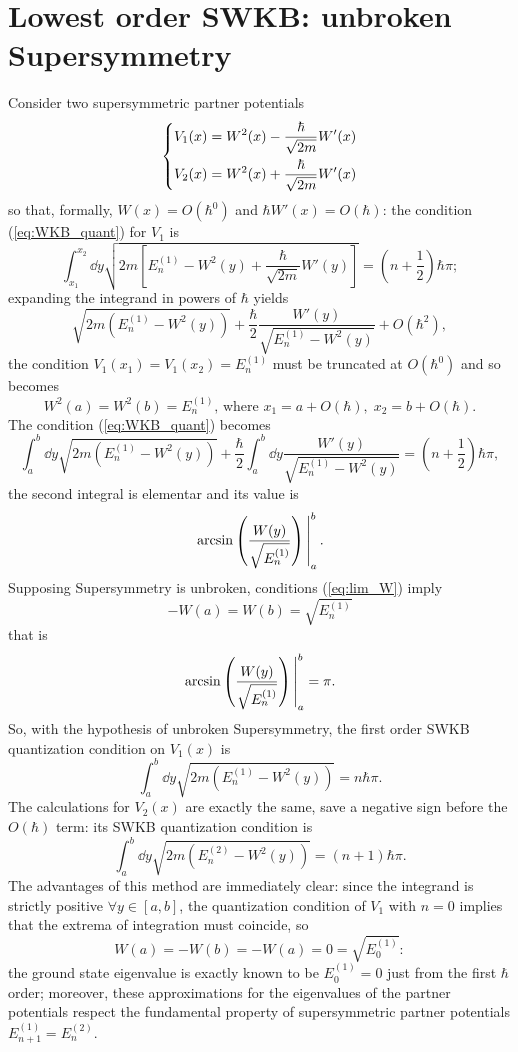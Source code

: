\section{Lowest order SWKB: unbroken Supersymmetry}
Consider two supersymmetric partner potentials
$$
\begin{dcases*}
V_1(x) = W^2(x)-\frac{\hbar}{\sqrt{2m}}W'(x)\\
V_2(x) = W^2(x)+\frac{\hbar}{\sqrt{2m}}W'(x)
\end{dcases*}
$$
so that, formally, $W(x) = O(\hbar^0)$ and
$\hbar W'(x) = O(\hbar)$: the condition (\ref{eq:WKB_quant}) for $V_1$
is
$$\int_{x_1}^{x_2}\dd y\sqrt{2m\left[E^{(1)}_n-W^2(y)+\frac{\hbar}{\sqrt{2m}}W'(y)
\right]}=\left(n+\frac{1}{2}\right)\hbar\pi;
$$
expanding the integrand in powers of $\hbar$ yields
$$\sqrt{2m\left(E_n^{(1)}-W^2(y)\right)}+\frac{\hbar}{2}\frac{W'(y)}{\sqrt{E_n^{(1)}
-W^2(y)}}+
O(\hbar^2),$$
the condition $V_1(x_1)=V_1(x_2)=E^{(1)}_n$ must be truncated at $O(\hbar^0)$
and so becomes
$$W^2(a)=W^2(b)=E_n^{(1)}\text{, where }
x_1 = a + O(\hbar),\;x_2 = b + O(\hbar).$$
The condition (\ref{eq:WKB_quant}) becomes
$$\int_{a}^{b}\dd y \sqrt{2m\left(E_n^{(1)}-W^2(y)\right)}+\frac{\hbar}{2}
\int_{a}^{b}\dd y \frac{W'(y)}{\sqrt{E^{(1)}_n-W^2(y)}}=\left(n+\frac{1}{2}\right)
\hbar\pi,$$
the second integral is elementar and its value is
$$\eval{\arcsin\left(\frac{W(y)}{\sqrt{E^{(1)}_n}}\right)}_a^b.$$
Supposing Supersymmetry is unbroken, conditions (\ref{eq:lim_W}) imply
$$-W(a)=W(b)=\sqrt{E^{(1)}_n}$$
that is
$$\eval{\arcsin\left(\frac{W(y)}{\sqrt{E^{(1)}_n}}\right)}_a^b=\pi.$$
So, with the hypothesis of unbroken Supersymmetry, the first order SWKB
quantization condition on $V_1(x)$ is
\begin{equation}
\int_{a}^{b}\dd y \sqrt{2m\left(E^{(1)}_n-W^2(y)\right)} = n\hbar\pi.
\label{eq:SWKB_quant_V1}
\end{equation}
The calculations for $V_2(x)$ are exactly the same, save a negative sign before the
$O(\hbar)$ term: its SWKB quantization condition is
\begin{equation}
\int_{a}^{b}\dd y \sqrt{2m\left(E^{(2)}_n-W^2(y)\right)} = (n+1)\hbar\pi.
\label{eq:SWKB_quant_V2}
\end{equation}
The advantages of this method are immediately clear: since the integrand
is strictly positive $\forall y\in[a,b]$, the quantization condition of $V_1$
with $n=0$ implies that the extrema of integration must coincide, so
$$W(a)=-W(b)=-W(a)=0=\sqrt{E^{(1)}_0}:$$
the ground state eigenvalue is exactly known to be
$E^{(1)}_0=0$ just from the first $\hbar$ order; moreover, these approximations
for the eigenvalues of the partner potentials respect the fundamental property of 
supersymmetric partner potentials $E^{(1)}_{n+1}=E^{(2)}_n$.

